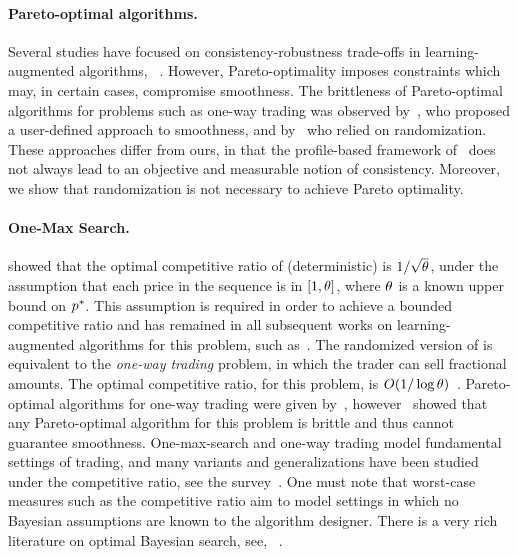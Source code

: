 \paragraph{Pareto-optimal algorithms.}
Several studies have focused on consistency-robustness trade-offs in learning-augmented algorithms, \eg~\citep{sun_pareto-optimal_2021,wei2020optimal,DBLP:conf/eenergy/Lee0HL24,DBLP:journals/iandc/Angelopoulos23,bamas2020primal,DBLP:conf/aistats/ChristiansonSW23,almanza2021online}. However, Pareto-optimality imposes constraints which may, in certain cases, compromise smoothness. The brittleness of Pareto-optimal algorithms for problems such as one-way trading was observed by~\citet{elenter2024overcoming}, who proposed a user-defined approach to smoothness, and by~\citet{benomar2025tradeoffs} who relied on randomization. These approaches differ from ours, in that the profile-based framework of~\citet{elenter2024overcoming} does not always lead to an objective and measurable notion of consistency. Moreover, we show that randomization is not necessary to achieve Pareto optimality. 

\paragraph{One-Max Search.} 
\citet{el-yaniv_competitive_1998} showed that the optimal competitive ratio of (deterministic) \OMS{} is $1/\sqrt{\theta}$, under the assumption that each price in the sequence is in $[1,\theta]$, where $\theta$ is a known upper bound on $p^*$. This assumption is required in order to achieve a bounded competitive ratio and has remained in all subsequent works on learning-augmented algorithms for this problem, such as~\citep{sun_pareto-optimal_2021,DBLP:conf/aaai/0001KZ22,DBLP:conf/icml/0004HCHWB24, benomar2025tradeoffs}.
The randomized version of \OMS{} is equivalent to the {\em one-way trading} problem, in which the trader can sell fractional amounts. The optimal competitive ratio, for this problem, is $O(1/\log \theta)$~\citep{el-yaniv_competitive_1998}. Pareto-optimal algorithms for one-way trading were given by~\citet{sun_pareto-optimal_2021}, however~\citet{elenter2024overcoming} showed that any Pareto-optimal algorithm for this problem is brittle and thus cannot guarantee smoothness. One-max-search and one-way trading model fundamental settings of trading, and many variants and generalizations have been studied under the competitive ratio, see the survey~\citep{mohr2014online}. One must note that worst-case measures such as the competitive ratio aim to model settings in which no Bayesian assumptions are known to the algorithm designer. There is a very rich literature on optimal Bayesian search, see, 
\eg~\citep{rosenfield1981optimal}.







